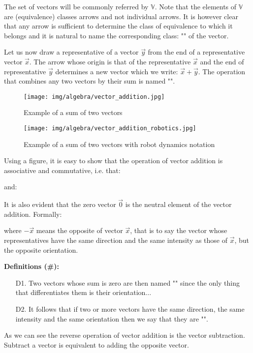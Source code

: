 The set of vectors will be commonly referred  by $\mathbb{V}$. Note that the elements of $\mathbb{V}$ are (equivalence) classes arrows and not individual arrows. It is however clear that any arrow is sufficient to determine the class of equivalence to which it belongs and it is natural to name the corresponding class: "" of the vector.

Let us now draw a representative of a vector $\vec{y}$ from the end of a representative vector $\vec{x}$. The arrow whose origin is that of the representative $\vec{x}$ and the end of representative $\vec{y}$ determines a new vector which we write: $\vec{x}+ \vec{y}$. The operation that combines any two vectors by their sum is named "".

\begin{figure}[H]
\centering
\texttt{[image: img/algebra/vector\_addition.jpg]}
\caption{Example of a sum of two vectors}
\end{figure}

\begin{figure}[H]
\centering
\texttt{[image: img/algebra/vector\_addition\_robotics.jpg]}
\caption{Example of a sum of two vectors with robot dynamics notation}
\end{figure}

Using a figure, it is easy to show that the operation of vector addition is associative and commutative, i.e. that:
	
and:
	
It is also evident that the zero vector $\vec{0}$ is the neutral element of the vector addition. Formally:
	
where $-\vec{x}$ means the opposite of vector $\vec{x}$, that is to say the vector whose representatives have the same direction and the same intensity as those of $\vec{x}$, but the opposite orientation. 

\textbf{Definitions (\#\mydef):}
	\begin{enumerate}
		\item[D1.] Two vectors whose sum is zero are then named "" since the only thing that differentiates them is their orientation...
		\item[D2.] It follows that if two or more vectors have the same direction, the same intensity and the same orientation then  we say that they are "".
	\end{enumerate}
As we can see the reverse operation of vector addition is the vector subtraction. Subtract a vector is equivalent to adding the opposite vector.

